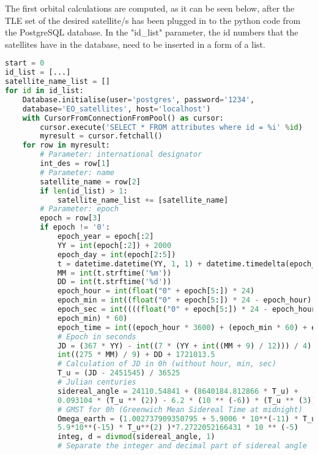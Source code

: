 \documentclass[12pt,a4paper,notitlepage,oneside,openright]{report}
\begin{document}
The first orbital calculations are computed, as it can be seen below, after the TLE set of the desired satellite/s has been plugged in to the python code from the PostgreSQL database. In the "id_list" parameter, the id numbers that the satellites have in the database, need to be inserted in a form of a list.
\begin{center}
\begin{lstlisting}[language=Python, formfeed=\newpage, extendedchars=true]
start = 0
id_list = [...]
satellite_name_list = []
for id in id_list:
    Database.initialise(user='postgres', password='1234',
    database='EO_satellites', host='localhost')
    with CursorFromConnectionFromPool() as cursor:
        cursor.execute('SELECT * FROM attributes where id = %i' %id)
        myresult = cursor.fetchall()
    for row in myresult:
        # Parameter: international designator
        int_des = row[1]
        # Parameter: name
        satellite_name = row[2]
        if len(id_list) > 1:
            satellite_name_list += [satellite_name]
        # Parameter: epoch
        epoch = row[3]
        if epoch != '0':
            epoch_year = epoch[:2]
            YY = int(epoch[:2]) + 2000
            epoch_day = int(epoch[2:5])
            t = datetime.datetime(YY, 1, 1) + datetime.timedelta(epoch_day - 1)
            MM = int(t.strftime('%m'))
            DD = int(t.strftime('%d'))
            epoch_hour = int(float("0" + epoch[5:]) * 24)
            epoch_min = int((float("0" + epoch[5:]) * 24 - epoch_hour) * 60)
            epoch_sec = int((((float("0" + epoch[5:]) * 24 - epoch_hour) * 60) -
            epoch_min) * 60)
            epoch_time = int((epoch_hour * 3600) + (epoch_min * 60) + epoch_sec)
            # Epoch in seconds
            JD = (367 * YY) - int((7 * (YY + int((MM + 9) / 12))) / 4) +
            int((275 * MM) / 9) + DD + 1721013.5 
            # Calculation of JD in 0h (without hour, min, sec)
            T_u = (JD - 2451545) / 36525
            # Julian centuries
            sidereal_angle = 24110.54841 + (8640184.812866 * T_u) +
            0.093104 * (T_u ** (2)) - 6.2 * (10 ** (-6)) * (T_u ** (3))
            # GMST for 0h (Greenwich Mean Sidereal Time at midnight)
            Omega_earth = (1.002737909350795 + 5.9006 * 10**(-11) * T_u -
            5.9*10**(-15) * T_u**(2) )*7.2722052166431 * 10 ** (-5)
            integ, d = divmod(sidereal_angle, 1)
            # Separate the integer and decimal part of sidereal angle

\end{lstlisting}
\end{center}
\end{document}
